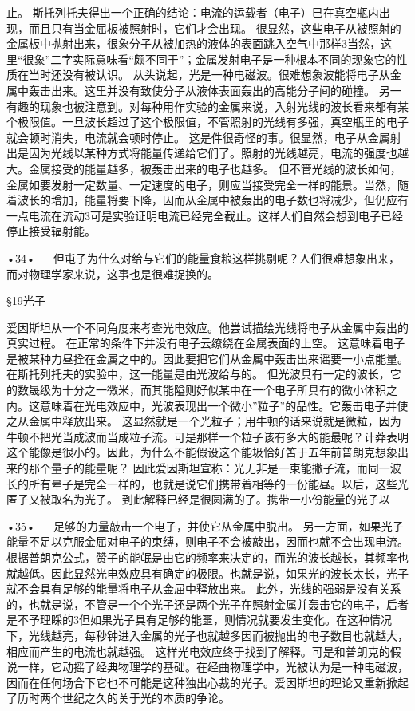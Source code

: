 止。
斯托列托夫得出一个正确的结论：电流的运载者（电子）巳在真空瓶内出现，而且只有当金屈板被照射时，它们才会出现。
很显然，这些电子从被照射的金属板中抛射出来，很象分子从被加热的液体的表面跳入空气中那样3当然，这里“很象”二字实际意味看“颇不同于”；金属发射电子是一种根本不同的现象它的性质在当时还没有被认识。
从头说起，光是一种电磁波。很难想象波能将电子从金属中轰击出来。这里并没有致使分子从液体表面轰出的高能分子间的碰撞。
另一有趣的现象也被注意到。对每种用作实验的金属来说，入射光线的波长看来都有某个极限值。一旦波长超过了这个极限值，不管照射的光线有多强，真空瓶里的电子就会顿时消失，电流就会顿时停止。
这是件很奇怪的事。很显然，电子从金属射出是因为光线以某种方式将能量传递给它们了。照射的光线越亮，电流的强度也越大。金属接受的能量越多，被轰击出来的电子也越多。
但不管光线的波长如何，金属如要发射一定数量、一定速度的电子，则应当接受完全一样的能景。当然，随着波长的增加，能量将要下降，因而从金属中被轰出的电子数也将减少，但仍应有一点电流在流动3可是实验证明电流已经完全截止。这样人们自然会想到电子已经停止接受辐射能。

•34•
  
但屯子为什么对给与它们的能量食粮这样挑剔呢？人们很难想象出来，而对物理学家来说，这事也是很难捉换的。

§19光子

爱因斯坦从一个不同角度来考查光电效应。他尝试描绘光线将电子从金属中轰出的真实过程。
在正常的条件下并没有电子云缭绕在金属表面的上空。
这意味着电子是被某种力昼拴在金属之中的。因此要把它们从金属中轰击出来谣要一小点能量。在斯托列托夫的实验中，这一能量是由光波给与的。
但光波具有一定的波长，它的数晟级为十分之一微米，而其能隘则好似某中在一个电子所具有的微小体积之内。这意味着在光电效应中，光波表现出一个微小”粒子”的品性。它轰击电子并使之从金属中释放出来。
这显然就是一个光粒子；用牛顿的话来说就是微粒，因为牛顿不把光当成波而当成粒子流。可是那样一个粒子该有多大的能最呢？计莽表明这个能像是很小的。因此，为什么不能假设这个能圾恰好笘于五年前普朗克想象出来的那个量子的能量呢？
因此爱因斯坦宣称：光无非是一束能撇子流，而同一波长的所有晕子是完全一样的，也就是说它们携带着相等的一份能昼。以后，这些光匿子又被取名为光子。
到此解释已经是很圆满的了。携带一小份能量的光子以

•35•
  
足够的力量敲击一个电子，并使它从金属中脱出。
另一方面，如果光子能量不足以克服金屈对电子的束缚，则电子不会被敲出，因而也就不会出现电流。根据普朗克公式，赞子的能氓是由它的频率来决定的，而光的波长越长，其频率也就越低。因此显然光电效应具有确定的极限。也就是说，如果光的波长太长，光子就不会具有足够的能量将电子从金屈中释放出来。
此外，光线的强弱是没有关系的，也就是说，不管是一个个光子还是两个光子在照射金属并轰击它的电子，后者是不予理睬的3但如果光子具有足够的能噩，则情况就要发生变化。在这种情况下，光线越亮，每秒钟进入金属的光子也就越多因而被抛出的电子数目也就越大，相应而产生的电流也就越强。
这样光电效应终于找到了解释。可是和普朗克的假说一样，它动摇了经典物理学的基础。在经曲物理学中，光被认为是一种电磁波，因而在任何场合下它也不可能是这种独出心裁的光子。爱因斯坦的理论又重新掀起了历时两个世纪之久的关于光的本质的争论。

